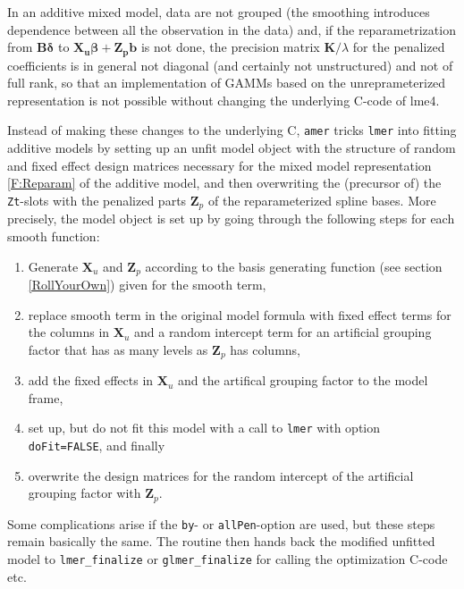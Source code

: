 \documentclass[12pt]{article}
\newcommand{\code}[1]{\texttt{\small{#1}}}
\newcommand{\package}[1]{\textsf{\small{#1}}}
\begin{document}
In an additive mixed model, data are not grouped (the smoothing introduces
dependence between all the observation in the data) and, if the reparametrization
from $\bm B \bm \delta$ to $\bm{X_u\beta} + \bm{Z_p b}$ is not done, the
precision matrix $\bm K/\lambda$ for the penalized coefficients is in general not
diagonal (and certainly not unstructured) and not of full rank, so that an
implementation of GAMMs based on the unreprameterized representation is not
possible without changing the underlying C-code of \package{lme4}.

Instead of making these changes to the underlying C, \code{amer} tricks
\code{lmer} into fitting additive models by setting up an unfit model object with
the structure of random and fixed effect design matrices necessary for the mixed
model representation \eqref{F:Reparam} of the additive model, and then
overwriting the (precursor of) the \code{Zt}-slots with the penalized parts $\bm
Z_p$ of the reparameterized spline bases. More precisely, the model object is set
up by going through the following steps for each smooth function:
\begin{enumerate}
\item Generate $\bm X_u$ and $\bm Z_p$ according to the basis generating
function (see section \ref{RollYourOwn}) given for the smooth term,
\item replace smooth term in the original model formula with fixed effect terms
for the columns in $\bm X_u$ and a random intercept term for an artificial
grouping factor that has as many levels as $\bm Z_p$ has columns,
\item add the fixed effects in $\bm X_u$ and the artifical grouping factor to the
model frame, \item set up, but do not fit this model with a call to \code{lmer}
with option \code{doFit=FALSE}, and finally
\item overwrite the design matrices for the random intercept of the artificial
grouping factor with $\bm Z_p$.
\end{enumerate}
Some complications arise if the \code{by}- or \code{allPen}-option are used, but
these steps remain basically the same. The routine then hands back the modified
unfitted model to \small{\verb+lmer_finalize+} or \small{\verb+glmer_finalize+}
for calling the optimization C-code etc.
\end{document}
